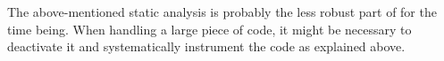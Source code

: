 \begin{important}
  The above-mentioned static analysis is probably the less robust part of \eacsl
  for the time being. When handling a large piece of code, it might be necessary
  to deactivate it and systematically instrument the code as explained above.
\end{important}









